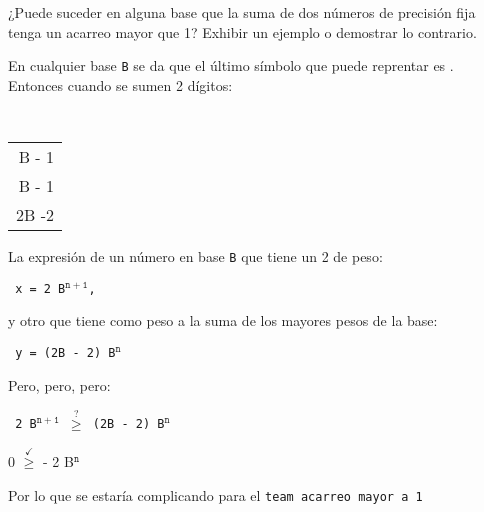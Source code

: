 \begin{enunciado}{\ejercicio}
  ¿Puede suceder en alguna base que la suma de dos números de precisión fija
  tenga un acarreo mayor que 1?
  Exhibir un ejemplo o demostrar lo contrario.
\end{enunciado}

En cualquier base \texttt{B} se da que el último símbolo que puede reprentar es
. Entonces cuando se sumen 2 dígitos:
\begin{center}
  \tt
  \begin{tabular}{r}
    B - 1 \\
    B - 1 \\ \hline
    2B -2
  \end{tabular}
\end{center}

La expresión de un número en base \texttt{B} que tiene un 2 de peso:
\begin{center}
  \tt
  x = 2 B$^\mathtt{n+1}$,
\end{center}
y otro que tiene como peso a la suma de los mayores pesos de la base:
\begin{center}
  \tt
  y = (2B - 2) B$^\mathtt{n}$
\end{center}
Pero, pero, pero:
\begin{center}
  \tt
  2 B$^\mathtt{n+1}$ $\stackrel{\mathtt{?}}{\geq}$ (2B - 2) B$^\mathtt{n}$\par
  0 $\stackrel{\mathtt{\checkmark}}{\geq}$  - 2 B$^\mathtt{n}$
\end{center}

Por lo que se estaría complicando para el \texttt{team acarreo mayor a 1}

\begin{aportes}
  \item {}
\end{aportes}
